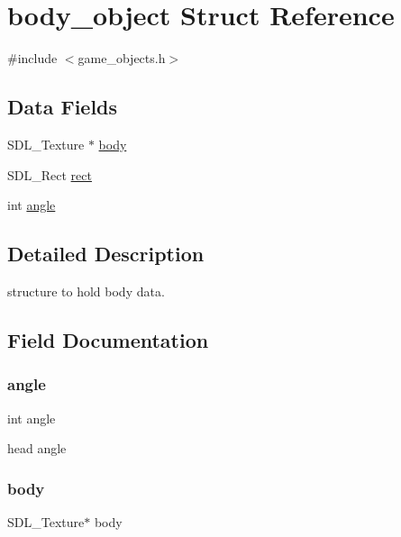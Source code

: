 \hypertarget{structbody__object}{}\section{body\+\_\+object Struct Reference}
\label{structbody__object}


{\ttfamily \#include $<$game\+\_\+objects.\+h$>$}

\subsection*{Data Fields}
\begin{DoxyCompactItemize}
\item 
S\+D\+L\+\_\+\+Texture $\ast$ \mbox{\hyperlink{structbody__object_a78cbc3f4a306ce98ce51b731549a5cf0}{body}}
\item 
S\+D\+L\+\_\+\+Rect \mbox{\hyperlink{structbody__object_a55aefd071649ac9dd8133e2d8a52d11f}{rect}}
\item 
int \mbox{\hyperlink{structbody__object_a63177970cacb40efba67ce501ea89210}{angle}}
\end{DoxyCompactItemize}


\subsection{Detailed Description}
structure to hold body data. 

\subsection{Field Documentation}
\mbox{\label{structbody__object_a63177970cacb40efba67ce501ea89210}} 
\subsubsection{\texorpdfstring{angle}{angle}}
{\footnotesize\ttfamily int angle}

head angle \mbox{\label{structbody__object_a78cbc3f4a306ce98ce51b731549a5cf0}} 
\subsubsection{\texorpdfstring{body}{body}}
{\footnotesize\ttfamily S\+D\+L\+\_\+\+Texture$\ast$ body}

